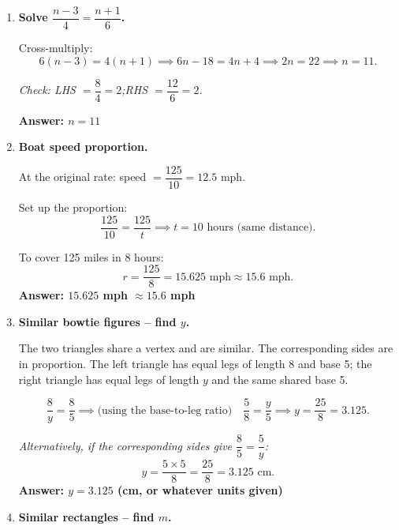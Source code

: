 \documentclass[11pt]{article}
\begin{document}
\begin{enumerate}[leftmargin=*, label=\textbf{\arabic*.}]
  Cross-multiply:
  \[
    15y = 32 \implies y = \frac{32}{15} \approx 2.13.
  \]
  \textbf{Answer: $y = \dfrac{32}{15} \approx 2.13$}

\vspace{0.3cm}
\item \textbf{Solve $\dfrac{n-3}{4} = \dfrac{n+1}{6}$.}

  Cross-multiply:
  \[
    6(n-3) = 4(n+1) \implies 6n - 18 = 4n + 4 \implies 2n = 22 \implies n = 11.
  \]

  \textit{Check: LHS $= \dfrac{8}{4} = 2$;\quad RHS $= \dfrac{12}{6} = 2$. \checkmark}

  \textbf{Answer: $n = 11$}

\vspace{0.3cm}
\item \textbf{Boat speed proportion.}

  At the original rate: speed $= \dfrac{125}{10} = 12.5$ mph.

  Set up the proportion:
  \[
    \frac{125}{10} = \frac{125}{t} \implies t = 10 \text{ hours (same distance).}
  \]

  To cover 125 miles in 8 hours:
  \[
    r = \frac{125}{8} = 15.625 \text{ mph} \approx 15.6 \text{ mph.}
  \]
  \textbf{Answer: $15.625$ mph $\approx 15.6$ mph}

\vspace{0.3cm}
\item \textbf{Similar bowtie figures -- find $y$.}

  The two triangles share a vertex and are similar. The corresponding sides
  are in proportion. The left triangle has equal legs of length 8 and base 5;
  the right triangle has equal legs of length $y$ and the same shared base 5.

  \[
    \frac{8}{y} = \frac{8}{5} \implies \text{(using the base-to-leg ratio)}
    \quad \frac{5}{8} = \frac{y}{5} \implies y = \frac{25}{8} = 3.125.
  \]

  \textit{Alternatively, if the corresponding sides give $\dfrac{8}{5} = \dfrac{5}{y}$:}
  \[
    y = \frac{5 \times 5}{8} = \frac{25}{8} = 3.125 \text{ cm.}
  \]
  \textbf{Answer: $y = 3.125$ (cm, or whatever units given)}

\vspace{0.3cm}
\item \textbf{Similar rectangles -- find $m$.}


\end{enumerate}
\end{document}
